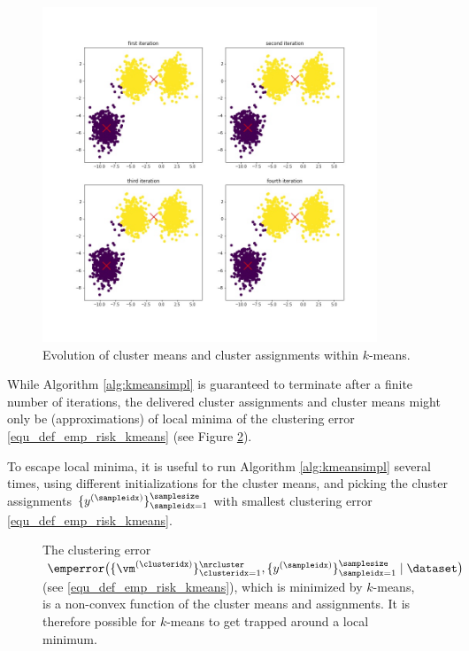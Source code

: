 \documentclass[12pt]{report}
\begin{document}
\begin{figure}[htbp]
\begin{center}
\includegraphics[width=10cm]{EvolKmeans.jpg}  
\vspace*{-6mm}
\end{center}
\caption{Evolution of cluster means and cluster assignments within $k$-means.}
\label{fig:first_iter_kmeans}
\end{figure}

While Algorithm \ref{alg:kmeansimpl} is guaranteed to terminate after a 
finite number of iterations, the delivered cluster assignments and cluster 
means might only be (approximations) of local minima of the clustering error 
\eqref{equ_def_emp_risk_kmeans} (see Figure \ref{fig_emp_risk_k_means}). 

To escape local minima, it is useful to run Algorithm \ref{alg:kmeansimpl} 
several times, using different initializations for the cluster means, 
and picking the cluster assignments $\{ y^{(\sampleidx)} \}_{\sampleidx=1}^{\samplesize}$ 
with smallest clustering error \eqref{equ_def_emp_risk_kmeans}. 

\begin{figure}[htbp]
\begin{center}
\end{center}
\caption{The clustering error $\emperror \big( \{\vm^{(\clusteridx)}\}_{\clusteridx=1}^{\nrcluster},\{y^{(\sampleidx)}\}_{\sampleidx=1}^{\samplesize} \mid \dataset \big)$ (see \eqref{equ_def_emp_risk_kmeans}), 
which is minimized by $k$-means, is a non-convex function of the cluster means and assignments. 
It is therefore possible for $k$-means to get trapped around a local minimum.} \label{fig_emp_risk_k_means}
\end{figure}
\end{document}
